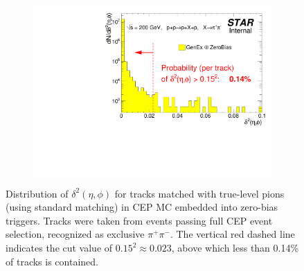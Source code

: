 \begin{figure}[h!]%
	\centering
	\parbox{0.685\textwidth}{
		\centering
		\begin{subfigure}[b]{\linewidth}
			\includegraphics[width=\linewidth]{graphics/eff/deltaEtaSqDeltaPhiSqMatchedExclusive.pdf}
		\end{subfigure}
	}%
	\quad%
	\parbox{0.285\textwidth}{
		\centering
		\begin{minipage}[t][0.78\linewidth][t]{\linewidth}\vspace{-60pt}
			\caption[Distribution of $\delta^{2}\left(\eta,\phi\right)$ in CEP MC.]%
			{Distribution of $\delta^{2}\left(\eta,\phi\right)$ for tracks matched with true-level pions (using standard matching) in CEP MC embedded into zero-bias triggers. Tracks were taken from events passing full CEP event selection, recognized as exclusive $\pi^{+}\pi^{-}$. The vertical red dashed line indicates the cut value of $0.15^{2} \approx 0.023$, above which less than 0.14\% of tracks is contained.}%
			\label{fig:deltaSqCEP}
		\end{minipage}
	}
\end{figure}



